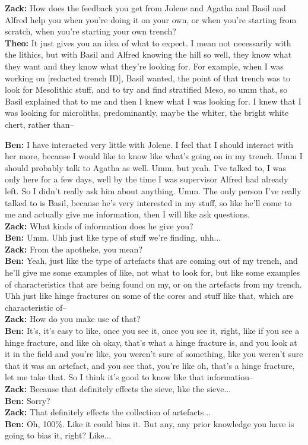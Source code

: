 \begin{arefs}
\item\label{A13}
\textbf{Zack:} How does the feedback you get from Jolene and Agatha and Basil and Alfred help you when you're doing it on your own, or when you're starting from scratch, when you're starting your own trench?\\
\textbf{Theo:} It just gives you an idea of what to expect. I mean not necessarily with the lithics, but with Basil and Alfred knowing the hill so well, they know what they want and they know what they're looking for. For example, when I was working on [redacted trench ID], Basil wanted, the point of that trench was to look for Mesolithic stuff, and to try and find stratified Meso, so umm that, so Basil explained that to me and then I knew what I was looking for. I knew that I was looking for microliths, predominantly, maybe the whiter, the bright white chert, rather than--

\item\label{A14}
\textbf{Ben:} I have interacted very little with Jolene. I feel that I should interact with her more, because I would like to know like what's going on in my trench. Umm I should probably talk to Agatha as well. Umm, but yeah. I've talked to, I was only here for a few days, well by the time I was supervisor Alfred had already left. So I didn't really ask him about anything. Umm. The only person I've really talked to is Basil, because he's very interested in my stuff, so like he'll come to me and actually give me information, then I will like ask questions.\\
\textbf{Zack:} What kinds of information does he give you?\\
\textbf{Ben:} Umm. Uhh just like type of stuff we're finding, uhh...\\
\textbf{Zack:} From the apotheke, you mean?\\
\textbf{Ben:} Yeah, just like the type of artefacts that are coming out of my trench, and he'll give me some examples of like, not what to look for, but like some examples of characteristics that are being found on my, or on the artefacts from my trench. Uhh just like hinge fractures on some of the cores and stuff like that, which are characteristic of--\\
\textbf{Zack:} How do you make use of that?\\
\textbf{Ben:} It's, it's easy to like, once you see it, once you see it, right, like if you see a hinge fracture, and like oh okay, that's what a hinge fracture is, and you look at it in the field and you're like, you weren't sure of something, like you weren't sure that it was an artefact, and you see that, you're like oh, that's a hinge fracture, let me take that. So I think it's good to know like that information--\\
\textbf{Zack:} Because that definitely effects the sieve, like the sieve...\\
\textbf{Ben:} Sorry?\\
\textbf{Zack:} That definitely effects the collection of artefacts...\\
\textbf{Ben:} Oh, 100\%. Like it could bias it. But any, any prior knowledge you have is going to bias it, right? Like...


\end{arefs}
